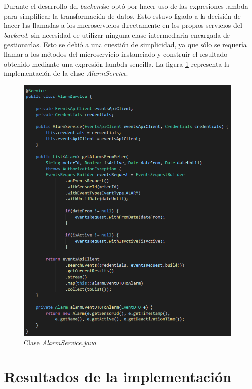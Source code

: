 \documentclass[pdftex,11pt,a4paper]{book}
\begin{document}
Durante el desarrollo del \textit{backend}se optó por hacer uso de las expresiones lambda para simplificar la transformación de datos. Esto estuvo ligado a la decisión de hacer las llamadas a los microservicios directamente en los propios servicios del \textit{backend}, sin necesidad de utilizar ninguna clase intermediaria encargada de gestionarlas. Esto se debió a una cuestión de simplicidad, ya que sólo se requería llamar a los métodos del microservicio instanciado y construir el resultado obtenido mediante una expresión lambda sencilla. La figura \ref{fig:watermeter-service-java} representa la implementación de la clase \textit{AlarmService}. 

\begin{figure}[H]
 \centering
 \includegraphics [scale=0.90] {images/implementacion/watermeter-service-java.png}
 \caption{Clase \textit{AlarmService.java}} \label{fig:watermeter-service-java}
 \end{figure}


\section{Resultados de la implementación} \label{seccion:resultados-implementacion}
\end{document}
